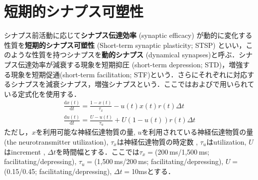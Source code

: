 \section{短期的シナプス可塑性}
シナプス前活動に応じて\textbf{シナプス伝達効率} (synaptic efficacy) が動的に変化する性質を\textbf{短期的シナプス可塑性} (Short-term synaptic plasticity; STSP) といい，このような性質を持つシナプスを\textbf{動的シナプス} (dynamical synapses)と呼ぶ．シナプス伝達効率が減衰する現象を短期抑圧 (short-term depression; STD)，増強する現象を短期促通(short-term facilitation; STF)という．さらにそれぞれに対応するシナプスを減衰シナプス，増強シナプスという．ここでは\citep{Mongillo2008-kk}および\citep{Orhan2019-rq}で用いられている定式化を使用する．
\begin{align}
\frac{\mathrm{d} x(t)}{\mathrm{d} t}=\frac{1-x(t)}{\tau_{x}}-u(t) x(t) r(t) \Delta t \\
\frac{\mathrm{d} u(t)}{\mathrm{d} t}=\frac{U-u(t)}{\tau_{u}}+U(1-u(t)) r(t) \Delta t
\end{align}
ただし，$x$を利用可能な神経伝達物質の量, $u$を利用されている神経伝達物質の量(the neurotransmitter utilization), $\tau_x$は神経伝達物質の時定数 , $\tau_u$はutilization, $U$はincrement , $\Delta t$を時間幅とする．ここでは$\tau_x=$(200 ms/1,500 ms; facilitating/depressing),  $\tau_u=$(1,500 ms/200 ms; facilitating/depressing), $U=$(0.15/0.45; facilitating/depressing), $\Delta t=$10msとする．
